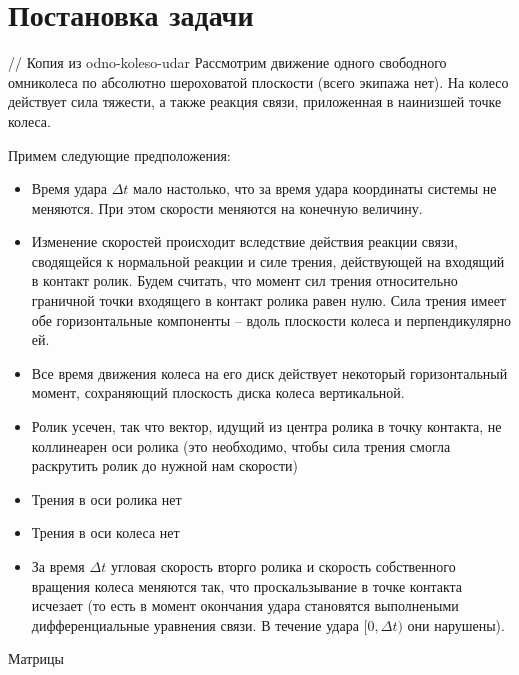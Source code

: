 
\section{Постановка задачи}
// Копия из odno-koleso-udar
Рассмотрим движение одного свободного омниколеса по абсолютно шероховатой плоскости (всего экипажа нет). На колесо действует сила тяжести, а также реакция связи, приложенная в наинизшей точке колеса.

Примем следующие предположения:
\begin{itemize}
\item Время удара $\Delta t$ мало настолько, что за время удара координаты системы не меняются. При этом скорости меняются на конечную величину.
\item Изменение скоростей происходит вследствие действия реакции связи, сводящейся к нормальной реакции и силе трения, действующей на входящий в контакт ролик. Будем считать, что момент сил трения относительно граничной точки входящего в контакт ролика равен нулю. Сила трения имеет обе горизонтальные компоненты -- вдоль плоскости колеса и перпендикулярно ей.
\item Все время движения колеса на его диск действует некоторый горизонтальный момент, сохраняющий плоскость диска колеса вертикальной.
\item Ролик усечен, так что вектор, идущий из центра ролика в точку контакта, не коллинеарен оси ролика (это необходимо, чтобы сила трения смогла раскрутить ролик до нужной нам скорости)
\item Трения в оси ролика нет
\item Трения в оси колеса нет
\item За время $\Delta t$ угловая скорость вторго ролика и скорость собственного вращения колеса меняются так, что проскальзывание в точке контакта исчезает (то есть в момент окончания удара становятся выполнеными дифференциальные уравнения связи. В течение удара $[0,\Delta t)$ они нарушены).
\end{itemize}


Матрицы

